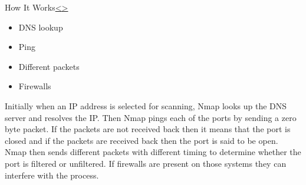 \documentclass[12pt]{extarticle}
\newenvironment{instructionblock}{\Large\bgroup}{\egroup}
\begin{document}
\pagebreak
\begin{slide}{How It Works}{\hyperref[slide 4]{\textless}\hyperref[slide 6]{\textgreater}}
	\begin{instructionblock}
		\begin{itemize}
			\item DNS lookup
			\item Ping
			\item Different packets
			\item Firewalls
		\end{itemize}
	\end{instructionblock}
\end{slide}

Initially when an IP address is selected for scanning, Nmap looks up the DNS server and resolves the IP. Then Nmap pings each of the ports by sending a zero byte packet. If the packets are not received back then it means that the port is closed and if the packets are received back then the port is said to be open. Nmap then sends different packets with different timing to determine whether the port is filtered or unfiltered. If firewalls are present on those systems they can interfere with the process.
\end{document}
